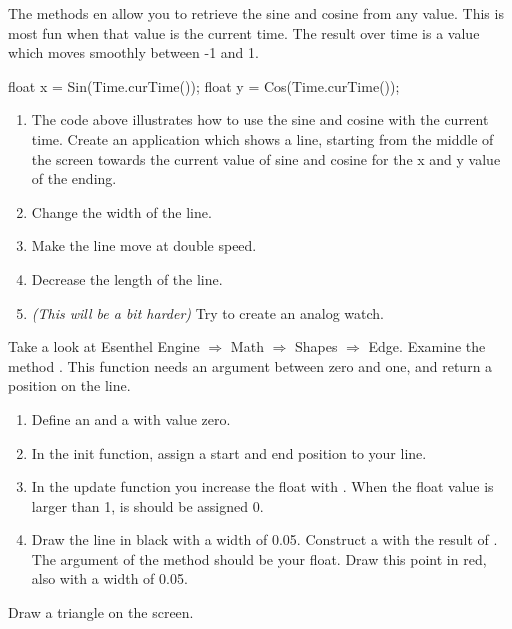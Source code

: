 \begin{exercise}
The methods  en  allow you to retrieve the sine and cosine from any value. This is most fun when that value is the current time. The result over time is a value which moves smoothly between -1 and 1.

\begin{code}
float x = Sin(Time.curTime());
float y = Cos(Time.curTime());
\end{code}

\begin{enumerate}
\item The code above illustrates how to use the sine and cosine with the current time. Create an application which shows a line, starting from the middle of the screen towards the current value of sine and cosine for the x and y value of the ending.
\item Change the width of the line.
\item Make the line move at double speed.
\item Decrease the length of the line. 
\item \textit{(This will be a bit harder)} Try to create an analog watch.
\end{enumerate}
\end{exercise}

\begin{exercise}
Take a look at Esenthel Engine $\Rightarrow$ Math $\Rightarrow$ Shapes $\Rightarrow$ Edge. Examine the method . This function needs an argument between zero and one, and return a position on the line.

\begin{enumerate}
\item Define an  and a  with value zero.
\item In the init function, assign a start and end position to your line.
\item In the update function you increase the float with . When the float value is larger than 1, is should be assigned 0.
\item Draw the line in black with a width of 0.05. Construct a  with the result of . The argument of the method should be your float. Draw this point in red, also with a width of 0.05.
\end{enumerate}
\end{exercise}

\begin{exercise}
Draw a triangle on the screen.
\end{exercise}


